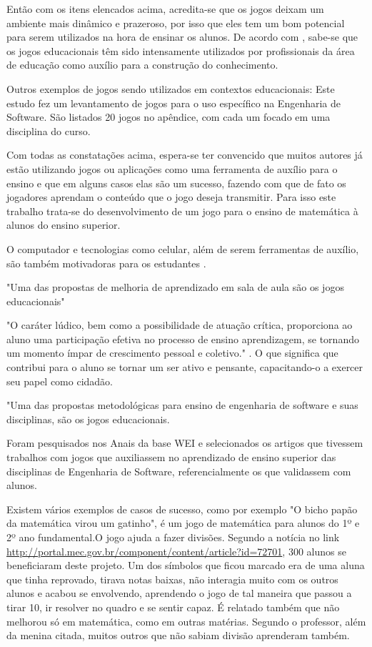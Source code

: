 Então com os itens elencados acima, acredita-se que os jogos deixam um ambiente mais dinâmico e prazeroso, por isso que eles tem um bom potencial para serem utilizados na hora de ensinar os alunos. De acordo com \cite{nunesParreira}, sabe-se que os jogos educacionais têm sido intensamente utilizados por profissionais da área de educação como auxílio para a construção do conhecimento.

Outros exemplos de jogos sendo utilizados em contextos educacionais: Este estudo \cite{sucessoJogoEngSoft} fez um levantamento de jogos para o uso específico na Engenharia de Software. São listados 20 jogos no apêndice, com cada um focado em uma disciplina do curso. 

Com todas as constatações acima, espera-se ter convencido que muitos autores já estão utilizando jogos ou aplicações como uma ferramenta de auxílio para o ensino e que em alguns casos elas são um sucesso, fazendo com que de fato os jogadores aprendam o conteúdo que o jogo deseja transmitir. Para isso este trabalho trata-se do desenvolvimento de um jogo para o ensino de matemática à alunos do ensino superior.

O computador e tecnologias como celular, além de serem ferramentas de auxílio, são também  motivadoras para os estudantes \cite{softwaregamificado}.


"Uma das propostas de melhoria de aprendizado em sala de aula são os jogos educacionais" \cite[p. 4]{sucessoJogoEngSoft}


"O caráter lúdico, bem como a possibilidade de atuação crítica, proporciona ao aluno uma participação efetiva no processo de ensino aprendizagem, se tornando um momento ímpar de crescimento pessoal e coletivo." \cite{jogoPratPedagoc}. O que significa que contribui para o aluno se tornar um ser ativo e pensante, capacitando-o a exercer seu papel como cidadão.


"Uma das propostas metodológicas para ensino de engenharia de software e suas disciplinas, são os jogos educacionais. 


\begin{citacao}
Foram pesquisados nos Anais da base WEI e selecionados os artigos que tivessem trabalhos com jogos que auxiliassem no aprendizado de ensino superior das disciplinas de Engenharia de Software, referencialmente os que validassem com alunos. \cite{sucessoJogoEngSoft}
\end{citacao}

 
Existem vários exemplos de casos de sucesso, como por exemplo "O bicho papão da matemática virou um gatinho", é um jogo de matemática para alunos do 1º e 2º ano fundamental.O jogo ajuda a fazer divisões. Segundo a notícia no link \url{http://portal.mec.gov.br/component/content/article?id=72701}, 300 alunos se beneficiaram deste projeto. Um dos símbolos que ficou marcado era de uma aluna que tinha reprovado, tirava notas baixas, não interagia muito com os outros alunos e acabou se envolvendo, aprendendo o jogo de tal maneira que passou a tirar 10, ir resolver no quadro e se sentir capaz. É relatado também que não melhorou só em matemática, como em outras matérias. Segundo o professor, além da menina citada, muitos outros que não sabiam divisão aprenderam também.

